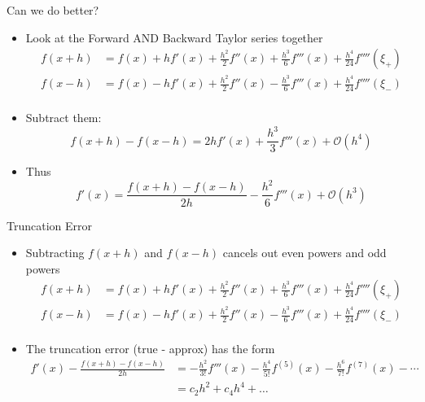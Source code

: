 \documentclass[10pt]{beamer}
\begin{document}
\begin{frame}{Can we do better?}
\begin{itemize}
    \item Look at the Forward AND Backward Taylor series together
    \begin{align*}
      f(x+h) & = f(x) + h f'(x) + \frac{h^2}{2}f''(x) + \frac{h^3}{6}f'''(x) + \frac{h^4}{24}f''''(\xi_{+})\\
      f(x-h) & = f(x) - h f'(x) + \frac{h^2}{2}f''(x) - \frac{h^3}{6}f'''(x) + \frac{h^4}{24}f''''(\xi_{-})\\
    \end{align*}

    \item<2-> Subtract them:
    \begin{equation*}
      f(x+h) - f(x-h) = 2 h f'(x) + \frac{h^3}{3}f'''(x) + \mathcal{O}(h^4)
    \end{equation*}
    \item<3-> Thus
    \begin{equation*}
      f'(x) = \frac{f(x+h) - f(x-h)}{2 h} - \frac{h^2}{6}f'''(x) + \mathcal{O}(h^3)
    \end{equation*}
\end{itemize}
\end{frame}
\begin{frame}{Truncation Error}
    \begin{itemize}
        \item Subtracting $f(x+h)$ and $f(x-h)$ cancels out even powers and odd powers 
            \begin{align*}
      f(x+h) & = f(x) + h f'(x) + \frac{h^2}{2}f''(x) + \frac{h^3}{6}f'''(x) + \frac{h^4}{24}f''''(\xi_{+})\\
      f(x-h) & = f(x) - h f'(x) + \frac{h^2}{2}f''(x) - \frac{h^3}{6}f'''(x) + \frac{h^4}{24}f''''(\xi_{-})\\
    \end{align*}

    \item The truncation error (true - approx) has the form 
    \begin{align*}
         f'(x) - \frac{f(x+h) - f(x-h)}{2 h} &= - \frac{h^2}{3!}f'''(x) - \frac{h^4}{5!}f^{(5)}(x) - \frac{h^6}{7!}f^{(7)}(x) - \cdots\\
          &= c_2 h^2 + c_4 h^4 + \ldots
    \end{align*}

    \end{itemize}
    
\end{frame}
\end{document}
